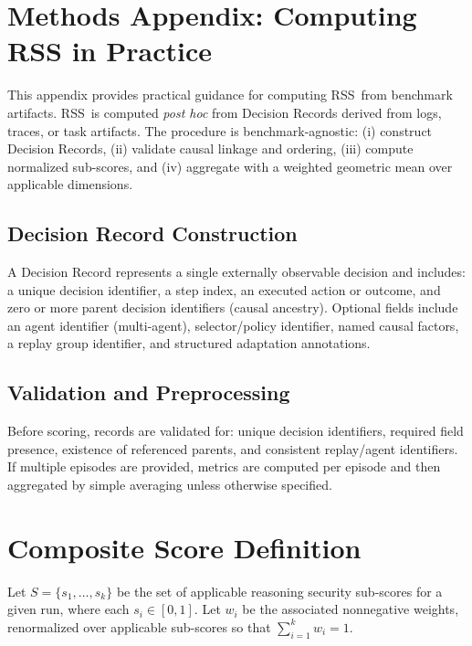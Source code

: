 \documentclass[11pt]{article}
\newcommand{\RSS}{\textsc{RSS}}
\begin{document}
\appendix

\section{Methods Appendix: Computing RSS in Practice}
\label{app:methods}

This appendix provides practical guidance for computing \RSS\ from benchmark artifacts. \RSS\ is computed \emph{post hoc} from Decision Records derived from logs, traces, or task artifacts. The procedure is benchmark-agnostic: (i) construct Decision Records, (ii) validate causal linkage and ordering, (iii) compute normalized sub-scores, and (iv) aggregate with a weighted geometric mean over applicable dimensions.

\subsection{Decision Record Construction}
A Decision Record represents a single externally observable decision and includes: a unique decision identifier, a step index, an executed action or outcome, and zero or more parent decision identifiers (causal ancestry). Optional fields include an agent identifier (multi-agent), selector/policy identifier, named causal factors, a replay group identifier, and structured adaptation annotations.

\subsection{Validation and Preprocessing}
Before scoring, records are validated for: unique decision identifiers, required field presence, existence of referenced parents, and consistent replay/agent identifiers. If multiple episodes are provided, metrics are computed per episode and then aggregated by simple averaging unless otherwise specified.

\section{Composite Score Definition}
\label{app:composite}

Let $S=\{s_1,\dots,s_k\}$ be the set of applicable reasoning security sub-scores for a given run, where each $s_i\in[0,1]$. Let $w_i$ be the associated nonnegative weights, renormalized over applicable sub-scores so that $\sum_{i=1}^{k} w_i = 1$.
\end{document}
